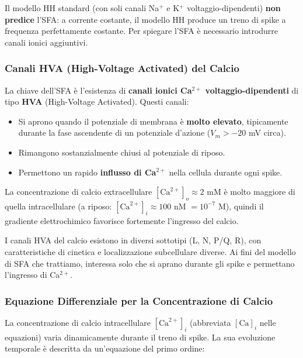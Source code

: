 Il modello HH standard (con soli canali Na$^+$ e K$^+$ voltaggio-dipendenti) \textbf{non predice} l'SFA: a corrente costante, il modello HH produce un treno di spike a frequenza perfettamente costante. Per spiegare l'SFA è necessario introdurre canali ionici aggiuntivi.

\subsubsection{Canali HVA (High-Voltage Activated) del Calcio}

La chiave dell'SFA è l'esistenza di \textbf{canali ionici Ca$^{2+}$ voltaggio-dipendenti} di tipo \textbf{HVA} (High-Voltage Activated). Questi canali:

\begin{itemize}
    \item Si aprono quando il potenziale di membrana è \textbf{molto elevato}, tipicamente durante la fase ascendente di un potenziale d'azione ($V_m > -20$ mV circa).
    \item Rimangono sostanzialmente chiusi al potenziale di riposo.
    \item Permettono un rapido \textbf{influsso di Ca$^{2+}$} nella cellula durante ogni spike.
\end{itemize}

La concentrazione di calcio extracellulare $[\text{Ca}^{2+}]_o \approx 2$ mM è molto maggiore di quella intracellulare (a riposo: $[\text{Ca}^{2+}]_i \approx 100$ nM $= 10^{-7}$ M), quindi il gradiente elettrochimico favorisce fortemente l'ingresso del calcio.

\begin{tcolorbox}[colback=gray!5, colframe=gray!40, arc=2mm, boxrule=0.5pt]
 I canali HVA del calcio esistono in diversi sottotipi (L, N, P/Q, R), con caratteristiche di cinetica e localizzazione subcellulare diverse. Ai fini del modello di SFA che trattiamo, interessa solo che si aprano durante gli spike e permettano l'ingresso di Ca$^{2+}$.
\end{tcolorbox}


\subsubsection{Equazione Differenziale per la Concentrazione di Calcio}

La concentrazione di calcio intracellulare $[\text{Ca}^{2+}]_i$ (abbreviata $[\text{Ca}]_i$ nelle equazioni) varia dinamicamente durante il treno di spike. La sua evoluzione temporale è descritta da un'equazione del primo ordine:

